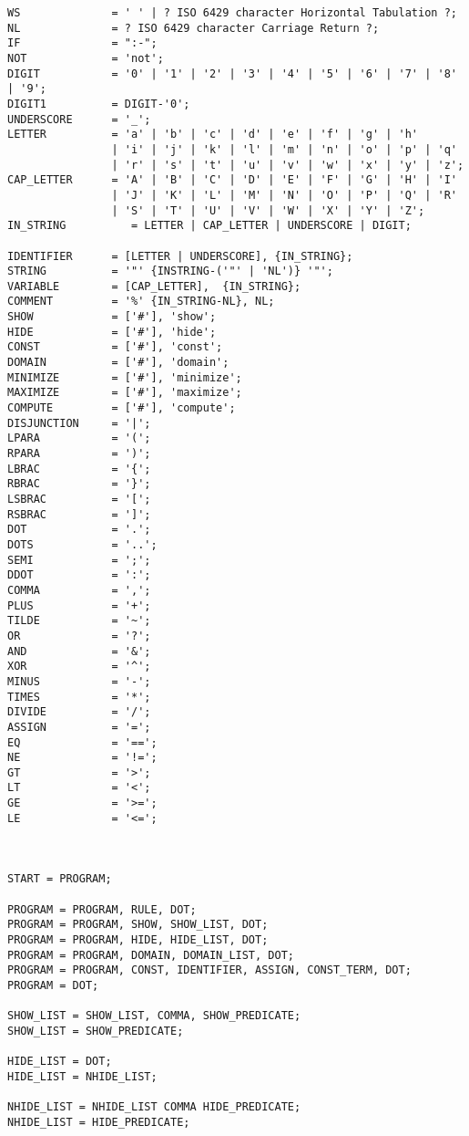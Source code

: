 		
\begin{verbatim}
WS              = ' ' | ? ISO 6429 character Horizontal Tabulation ?;
NL              = ? ISO 6429 character Carriage Return ?;
IF              = ":-";
NOT             = 'not';
DIGIT           = '0' | '1' | '2' | '3' | '4' | '5' | '6' | '7' | '8' | '9';
DIGIT1          = DIGIT-'0';
UNDERSCORE      = '_';
LETTER          = 'a' | 'b' | 'c' | 'd' | 'e' | 'f' | 'g' | 'h'
                | 'i' | 'j' | 'k' | 'l' | 'm' | 'n' | 'o' | 'p' | 'q'
                | 'r' | 's' | 't' | 'u' | 'v' | 'w' | 'x' | 'y' | 'z';
CAP_LETTER      = 'A' | 'B' | 'C' | 'D' | 'E' | 'F' | 'G' | 'H' | 'I'
                | 'J' | 'K' | 'L' | 'M' | 'N' | 'O' | 'P' | 'Q' | 'R'
                | 'S' | 'T' | 'U' | 'V' | 'W' | 'X' | 'Y' | 'Z';
IN_STRING          = LETTER | CAP_LETTER | UNDERSCORE | DIGIT;

IDENTIFIER      = [LETTER | UNDERSCORE], {IN_STRING};
STRING          = '"' {INSTRING-('"' | 'NL')} '"';
VARIABLE        = [CAP_LETTER],  {IN_STRING};
COMMENT         = '%' {IN_STRING-NL}, NL;
SHOW            = ['#'], 'show';
HIDE            = ['#'], 'hide';
CONST           = ['#'], 'const';
DOMAIN          = ['#'], 'domain';
MINIMIZE        = ['#'], 'minimize';
MAXIMIZE        = ['#'], 'maximize';
COMPUTE         = ['#'], 'compute';
DISJUNCTION     = '|';
LPARA           = '(';
RPARA           = ')';
LBRAC           = '{';
RBRAC           = '}';
LSBRAC          = '[';
RSBRAC          = ']';
DOT             = '.';
DOTS            = '..';
SEMI            = ';';
DDOT            = ':';
COMMA           = ',';
PLUS            = '+';
TILDE           = '~';
OR              = '?';
AND             = '&';
XOR             = '^';
MINUS           = '-';
TIMES           = '*';
DIVIDE          = '/';
ASSIGN          = '=';
EQ              = '==';
NE              = '!=';
GT              = '>';
LT              = '<';
GE              = '>=';
LE              = '<=';



START = PROGRAM;

PROGRAM = PROGRAM, RULE, DOT;
PROGRAM = PROGRAM, SHOW, SHOW_LIST, DOT;
PROGRAM = PROGRAM, HIDE, HIDE_LIST, DOT;
PROGRAM = PROGRAM, DOMAIN, DOMAIN_LIST, DOT;
PROGRAM = PROGRAM, CONST, IDENTIFIER, ASSIGN, CONST_TERM, DOT;
PROGRAM = DOT;

SHOW_LIST = SHOW_LIST, COMMA, SHOW_PREDICATE;
SHOW_LIST = SHOW_PREDICATE;

HIDE_LIST = DOT;
HIDE_LIST = NHIDE_LIST;

NHIDE_LIST = NHIDE_LIST COMMA HIDE_PREDICATE;
NHIDE_LIST = HIDE_PREDICATE;


\end{verbatim}
